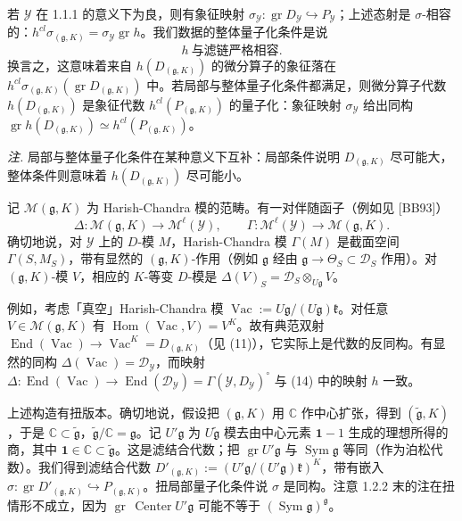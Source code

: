 若 $\mathcal{Y}$ 在 1.1.1 的意义下为良，则有象征映射 $\sigma_{\mathcal{Y}}:\operatorname{gr}D_{\mathcal{Y}}\hookrightarrow P_{\mathcal{Y}}$；上述态射是 $\sigma$-相容的：$h^{cl}\sigma_{(\mathfrak{g},K)}=\sigma_{\mathcal{Y}}\operatorname{gr}h$。我们数据的整体量子化条件是说
\begin{equation}\tag{15}
h\ \text{与滤链严格相容}.
\end{equation}
换言之，这意味着来自 $h(D_{(\mathfrak{g},K)})$ 的微分算子的象征落在 $h^{cl}\sigma_{(\mathfrak{g},K)}(\operatorname{gr}D_{(\mathfrak{g},K)})$ 中。若局部与整体量子化条件都满足，则微分算子代数 $h(D_{(\mathfrak{g},K)})$ 是象征代数 $h^{cl}(P_{(\mathfrak{g},K)})$ 的量子化：象征映射 $\sigma_{\mathcal{Y}}$ 给出同构 $\operatorname{gr}h(D_{(\mathfrak{g},K)})\simeq h^{cl}(P_{(\mathfrak{g},K)})$。

\emph{注.} 局部与整体量子化条件在某种意义下互补：局部条件说明 $D_{(\mathfrak{g},K)}$ 尽可能大，整体条件则意味着 $h(D_{(\mathfrak{g},K)})$ 尽可能小。


 记 $\mathcal{M}(\mathfrak{g},K)$ 为 Harish-Chandra 模的范畴。有一对伴随函子（例如见 [BB93]）
\[
\Delta:\mathcal{M}(\mathfrak{g},K)\to\mathcal{M}^{\ell}(\mathcal{Y}),\qquad
\Gamma:\mathcal{M}^{\ell}(\mathcal{Y})\to\mathcal{M}(\mathfrak{g},K).
\]
确切地说，对 $\mathcal{Y}$ 上的 $D$-模 $M$，Harish-Chandra 模 $\Gamma(M)$ 是截面空间 $\Gamma(S,M_S)$，带有显然的 $(\mathfrak{g},K)$-作用（例如 $\mathfrak{g}$ 经由 $\mathfrak{g}\to\Theta_S\subset\mathcal{D}_S$ 作用）。对 $(\mathfrak{g},K)$-模 $V$，相应的 $K$-等变 $D$-模是 $\Delta(V)_S=\mathcal{D}_S\otimes_{U\mathfrak{g}}V$。

例如，考虑「真空」Harish-Chandra 模 $\operatorname{Vac}:=U\mathfrak{g}/(U\mathfrak{g})\mathfrak{k}$。对任意 $V\in\mathcal{M}(\mathfrak{g},K)$ 有 $\operatorname{Hom}(\operatorname{Vac},V)=V^{K}$。故有典范双射 $\operatorname{End}(\operatorname{Vac})\to\operatorname{Vac}^{K}=D_{(\mathfrak{g},K)}$（见 (11)），它实际上是代数的反同构。有显然的同构 $\Delta(\operatorname{Vac})=\mathcal{D}_{\mathcal{Y}}$，而映射 $\Delta:\operatorname{End}(\operatorname{Vac})\to\operatorname{End}(\mathcal{D}_{\mathcal{Y}})=\Gamma(\mathcal{Y},D_{\mathcal{Y}})^{\circ}$ 与 (14) 中的映射 $h$ 一致。

 上述构造有扭版本。确切地说，假设把 $(\mathfrak{g},K)$ 用 $\mathbb{C}$ 作中心扩张，得到 $(\tilde{\mathfrak{g}},K)$，于是 $\mathbb{C}\subset\tilde{\mathfrak{g}}$，$\tilde{\mathfrak{g}}/\mathbb{C}=\mathfrak{g}$。记 $U'\mathfrak{g}$ 为 $U\tilde{\mathfrak{g}}$ 模去由中心元素 $\mathbf{1}-1$ 生成的理想所得的商，其中 $\mathbf{1}\in\mathbb{C}\subset\tilde{\mathfrak{g}}$。这是滤结合代数；把 $\operatorname{gr}U'\mathfrak{g}$ 与 $\operatorname{Sym}\mathfrak{g}$ 等同（作为泊松代数）。我们得到滤结合代数 $D'_{(\mathfrak{g},K)}:=(U'\mathfrak{g}/(U'\mathfrak{g})\mathfrak{k})^{K}$，带有嵌入 $\sigma:\operatorname{gr}D'_{(\mathfrak{g},K)}\hookrightarrow P_{(\mathfrak{g},K)}$。扭局部量子化条件说 $\sigma$ 是同构。注意 1.2.2 末的注在扭情形不成立，因为 $\operatorname{gr}\,\operatorname{Center}U'\mathfrak{g}$ 可能不等于 $(\operatorname{Sym}\mathfrak{g})^{\mathfrak{g}}$。

